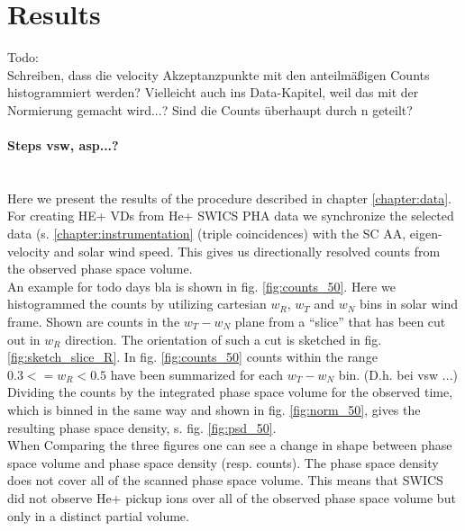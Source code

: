 
\chapter{Results} %
\label{chap:results}



%
%
%
Todo:\\
Schreiben, dass die velocity Akzeptanzpunkte mit den anteilmäßigen Counts histogrammiert werden? Vielleicht auch ins Data-Kapitel, weil das mit der Normierung gemacht wird...? Sind die Counts überhaupt durch n geteilt?\\ \\
\textbf{Steps vsw, asp...?}
\\ \\ \\
Here we present the results of the procedure described in chapter \ref{chapter:data}. For creating HE+ VDs from He+ SWICS PHA data we synchronize the selected data (s. \ref{chapter:instrumentation} (triple coincidences) with the SC AA, eigen-velocity and solar wind speed.
This gives us directionally resolved counts from the observed phase space volume.
\\
An example for todo days bla is shown in fig. \ref{fig:counts_50}. Here we histogrammed the counts by utilizing cartesian $w_R$, $w_T$ and $w_N$ bins in solar wind frame. Shown are counts in the $w_T - w_N$ plane from a ``slice'' that has been cut out in $w_R$ direction. The orientation of such a cut is sketched in fig. \ref{fig:sketch_slice_R}. In fig. \ref{fig:counts_50} counts within the range $0.3 <= w_R < 0.5$ have been summarized for each $w_T - w_N$ bin.
(D.h. bei vsw ...)
\\
Dividing the counts by the integrated phase space volume for the observed time, which is binned in the same way and shown in fig. \ref{fig:norm_50}, gives the resulting phase space density, s. fig. \ref{fig:psd_50}.\\
When Comparing the three figures one can see a change in shape between phase space volume and phase space density (resp. counts). The phase space density does not cover all of the scanned phase space volume. This means that SWICS did not observe He+ pickup ions over all of the observed phase space volume but only in a distinct partial volume.\\ 
